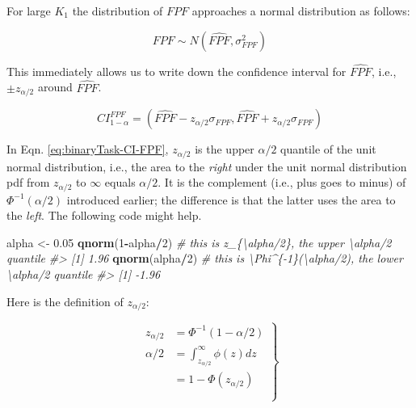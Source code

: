\documentclass[
]{book}
\newenvironment{Shaded}{\begin{snugshade}}{\end{snugshade}}
\newcommand{\CommentTok}[1]{\textcolor[rgb]{0.56,0.35,0.01}{\textit{#1}}}
\newcommand{\DecValTok}[1]{\textcolor[rgb]{0.00,0.00,0.81}{#1}}
\newcommand{\FloatTok}[1]{\textcolor[rgb]{0.00,0.00,0.81}{#1}}
\newcommand{\KeywordTok}[1]{\textcolor[rgb]{0.13,0.29,0.53}{\textbf{#1}}}
\newcommand{\NormalTok}[1]{#1}
\newcommand{\OperatorTok}[1]{\textcolor[rgb]{0.81,0.36,0.00}{\textbf{#1}}}
\newcommand{\StringTok}[1]{\textcolor[rgb]{0.31,0.60,0.02}{#1}}
\begin{document}
For large \(K_1\) the distribution of \(FPF\) approaches a normal distribution as follows:

\[FPF \sim N\left ( \widehat{FPF}, \sigma_{FPF}^2 \right )\]

This immediately allows us to write down the confidence interval for \(\widehat{FPF}\), i.e., \(\pm z_{\alpha/2}\) around \(\widehat{FPF}\).

\begin{equation} 
CI_{1-\alpha}^{FPF}=\left ( \widehat{FPF} - z_{\alpha/2} \sigma_{FPF}, \widehat{FPF} + z_{\alpha/2} \sigma_{FPF} \right )
\label{eq:binaryTask-CI-FPF}
\end{equation}

In Eqn. \eqref{eq:binaryTask-CI-FPF}, \(z_{\alpha/2}\) is the upper \(\alpha/2\) quantile of the unit normal distribution, i.e., the area to the \emph{right} under the unit normal distribution pdf from \(z_{\alpha/2}\) to \(\infty\) equals \(\alpha/2\). It is the complement (i.e., plus goes to minus) of \(\Phi^{-1}(\alpha/2)\) introduced earlier; the difference is that the latter uses the area to the \emph{left}. The following code might help.

\begin{Shaded}
\begin{Highlighting}[]
\NormalTok{alpha \textless{}{-}}\StringTok{ }\FloatTok{0.05}
\KeywordTok{qnorm}\NormalTok{(}\DecValTok{1}\OperatorTok{{-}}\NormalTok{alpha}\OperatorTok{/}\DecValTok{2}\NormalTok{) }\CommentTok{\# this is z\_\{\textbackslash{}alpha/2\}, the upper \textbackslash{}alpha/2 quantile}
\CommentTok{\#\textgreater{} [1] 1.96}
\KeywordTok{qnorm}\NormalTok{(alpha}\OperatorTok{/}\DecValTok{2}\NormalTok{)   }\CommentTok{\# this is \textbackslash{}Phi\^{}\{{-}1\}(\textbackslash{}alpha/2), the lower \textbackslash{}alpha/2 quantile}
\CommentTok{\#\textgreater{} [1] {-}1.96}
\end{Highlighting}
\end{Shaded}

Here is the definition of \(z_{\alpha/2}\):

\begin{equation} 
\left.
\begin{aligned} 
z_{\alpha/2} &=\Phi^{-1}\left ( 1-\alpha/2 \right )\\
\alpha/2&=\int_{z_{\alpha/2}}^{\infty}\phi(z)dz\\ 
&= 1-\Phi(z_{\alpha/2})\\
\\
\end{aligned}
\right \} 
\label{eq:binaryTask-def-z-alpha2}
\end{equation}
\end{document}
